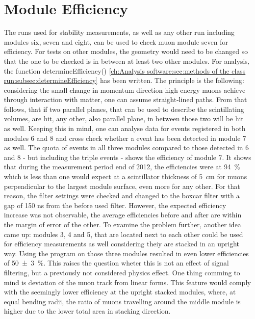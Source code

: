   \section{Module Efficiency}
  \label{ch:Analysis:sec:Module Efficiency}
  The runs used for stability measurements, as well as any other run including modules six, seven and eight, can be used to check muon module seven for efficiency. For tests on other modules, the geometry would need to be changed so that the one to be checked is in between at least two other modules.
  For analysis, the function determineEfficiency() \ref{ch:Analysis software:sec:methods of the class run:subsec:determineEfficiency}
  has been written.
  The principle is the following: considering the small change in momentum direction high energy muons achieve through interaction with matter, one can assume straight-lined paths. From that follows, that if two parallel planes, that can be used to describe the scintillating volumes, are hit, any other, also parallel plane, in between those two will be hit as well. Keeping this in mind, one can analyse data for events registered in both modules 6 and 8 and cross check whether a event has been detected in module 7 as well. The quota of events in all three modules compared to those detected in 6 and 8 - but including the triple events - shows the efficiency of module 7.
  It shows that during the measurement period end of 2012, the efficiencies were at  \SI{94 }{\percent} which is less than one would expect at a scintillator thickness of \SI{5}{\centi\meter} for muons perpendicular to the largest module surface, even more for any other.
  For that reason, the filter settings were checked and changed to the boxcar filter with a gap of 150 ns from the before used  filter. However, the expected efficiency increase was not observable, the average efficiencies before and after are within the margin of error of the other.
  To examine the problem further, another idea came up: modules 3, 4 and 5, that are located next to each other could be used for efficiency measurements as well considering theiy are stacked in an upright way. Using the program on those three modules resulted in even lower efficiencies of \SI{50(3)}{\percent}. This raises the question wheter this is not an effect of signal filtering, but a previously not considered physics effect. One thing comming to mind is deviation of the muon track from linear forms. This feature would comply with the seemingly lower efficiency at the upright stacked modules, where, at equal bending radii, the ratio of muons travelling around the middle module is higher due to the lower total area in stacking direction.
